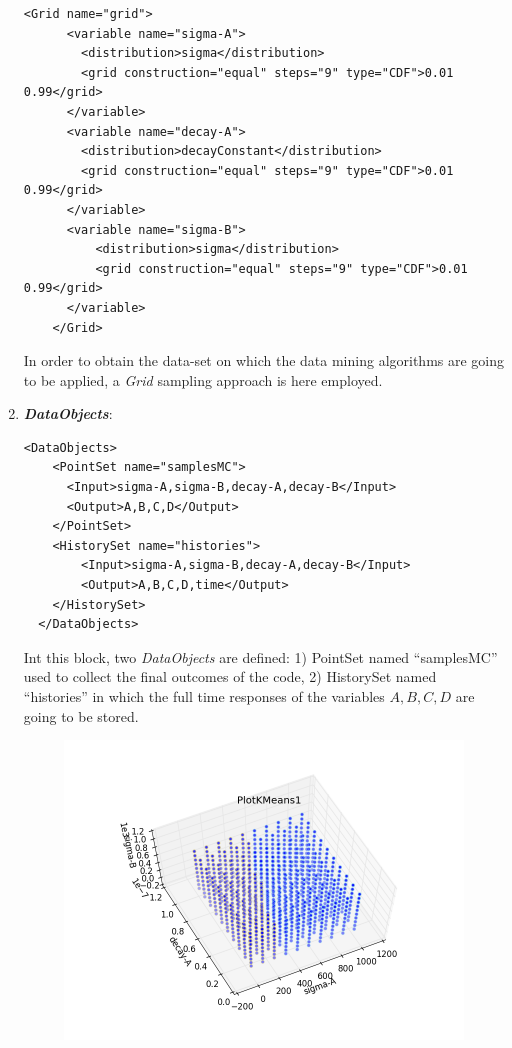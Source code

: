 \begin{enumerate}
\begin{lstlisting}[style=XML,morekeywords={arg,extension,pauseAtEnd,overwrite}]
    <Grid name="grid">
      <variable name="sigma-A">
        <distribution>sigma</distribution>
        <grid construction="equal" steps="9" type="CDF">0.01 0.99</grid>
      </variable>
      <variable name="decay-A">
        <distribution>decayConstant</distribution>
        <grid construction="equal" steps="9" type="CDF">0.01 0.99</grid>
      </variable>
      <variable name="sigma-B">
          <distribution>sigma</distribution>
          <grid construction="equal" steps="9" type="CDF">0.01 0.99</grid>
      </variable>
    </Grid>
\end{lstlisting}
  In order to obtain the data-set on which the data mining algorithms are going to be applied, a \textit{Grid} sampling approach is here employed.
   \item \textbf{\textit{DataObjects}}:
\begin{lstlisting}[style=XML,morekeywords={arg,extension,pauseAtEnd,overwrite}]
  <DataObjects>
    <PointSet name="samplesMC">
      <Input>sigma-A,sigma-B,decay-A,decay-B</Input>
      <Output>A,B,C,D</Output>
    </PointSet>
    <HistorySet name="histories">
        <Input>sigma-A,sigma-B,decay-A,decay-B</Input>
        <Output>A,B,C,D,time</Output>
    </HistorySet>
  </DataObjects>
\end{lstlisting}
  Int this block, two \textit{DataObjects} are defined:
  1) PointSet named ``samplesMC'' used to collect the final outcomes of
  the code,
  2) HistorySet named ``histories'' in which the full time responses of the
  variables $A,B,C,D$ are going to be stored.
 \begin{figure}[h!]
  \centering
  \includegraphics[scale=0.7]{pics/dataminingK-means.png}

\end{figure}
\end{enumerate}
